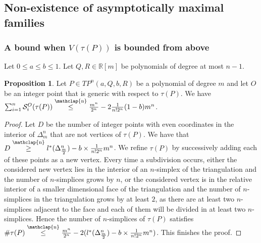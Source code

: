 \documentclass[12pt]{article}
\newcommand\customleq{\stackrel{\mathclap{\normalfont\scriptsize\mbox{n}}}{\leq}}
\newcommand\customgeq{\stackrel{\mathclap{\normalfont\scriptsize\mbox{n}}}{\geq}}
\theoremstyle{definition}
\newtheorem{prop}{Proposition}[section]
\newtheorem{rmk}{Remark}[section]
\begin{document}



\subsection{Non-existence of asymptotically maximal families}

\subsubsection{A bound when $V(\tau(P))$ is bounded from above}

\begin{sloppypar}
    Let $0 \leq a \leq b \leq 1$. Let $Q,R \in \mathbb{R}[m]$ be polynomials of degree at most $n-1$.
\end{sloppypar}

\begin{prop}
    \label{thm_nombre_de_betti_total_cas_1}
    Let $P \in TP^n(a, Q, b, R)$ be a polynomial of degree $m$ and let $O$ be an integer point that is generic with respect to $\tau(P)$. We have $\sum_{i=1}^n \mathcal{S}_i^O(\tau(P)) \customleq \frac{m^n}{2^n} - 2\frac{1}{n!2^n}(1-b)m^n$. 
\end{prop}

\begin{proof}
    Let $D$ be the number of integer points with even coordinates in the interior of $\Delta_m^n$ that are not vertices of $\tau(P)$. We have that $D \customgeq l^*(\Delta_{\frac{m}{2}}^n) - b\times \frac{1}{n!2^n}m^n$. We refine $\tau(P)$ by successively adding each of these points as a new vertex. Every time a subdivision occurs, either the considered new vertex lies in the interior of an $n$-simplex of the triangulation and the number of $n$-simplices grows by $n$, or the considered vertex is in the relative interior of a smaller dimensional face of the triangulation and the number of $n$-simplices in the triangulation grows by at least $2$, as there are at least two $n$-simplices adjacent to the face and each of them will be divided in at least two $n$-simplices. Hence the number of $n$-simplices of $\tau(P)$ satisfies $\#\tau(P) \customleq \frac{m^n}{2^n} - 2(l^*(\Delta_{\frac{m}{2}}^n) - b\times \frac{1}{n!2^n}m^n)$. This finishes the proof.
\end{proof}
\end{document}
